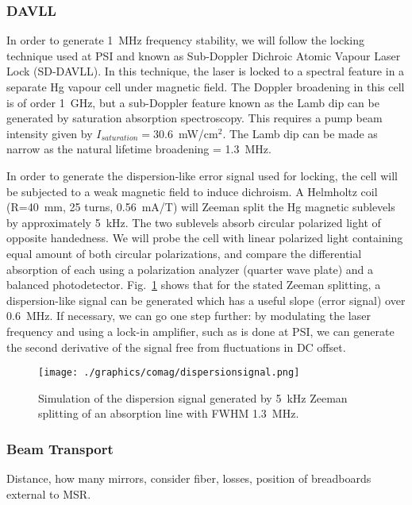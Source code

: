\documentclass[11pt]{article}
\begin{document}
\subsubsection{DAVLL}
In order to generate 1~MHz frequency stability, we will follow the locking technique used at PSI and known as Sub-Doppler Dichroic Atomic Vapour Laser Lock (SD-DAVLL).  In this technique, the laser is locked to a spectral feature in a separate Hg vapour cell under magnetic field.  The Doppler broadening in this cell is of order 1~GHz, but a sub-Doppler feature known as the Lamb dip can be generated by saturation absorption spectroscopy.  This requires a pump beam intensity given by $I_{saturation} = 30.6$~mW/cm$^2$.  The Lamb dip can be made as narrow as the natural lifetime broadening = 1.3~MHz.

In order to generate the dispersion-like error signal used for locking, the cell will be subjected to a weak magnetic field to induce dichroism. A Helmholtz coil (R=40~mm, 25 turns, 0.56~mA/T) will Zeeman split the Hg magnetic sublevels by approximately 5~kHz.  The two sublevels absorb circular polarized light of opposite handedness.  We will probe the cell with linear polarized light containing equal amount of both circular polarizations, and compare the differential absorption of each using a polarization analyzer (quarter wave plate) and a balanced photodetector.  Fig.~\ref{fig:dispersionsignal} shows that for the stated Zeeman splitting, a dispersion-like signal can be generated which has a useful slope (error signal) over 0.6~MHz.  If necessary, we can go one step further: by modulating the laser frequency and using a lock-in amplifier, such as is done at PSI, we can generate the second derivative of the signal free from fluctuations in DC offset. 

\begin{figure}[ht]
\begin{center}
\texttt{[image: ./graphics/comag/dispersionsignal.png]}
\caption{Simulation of the dispersion signal generated by 5~kHz Zeeman splitting of an absorption line with FWHM 1.3~MHz.}
\label{fig:dispersionsignal}
\end{center}
\end{figure}

\subsubsection{Beam Transport}
Distance, how many mirrors, consider fiber, losses, position of breadboards external to MSR.
\end{document}

